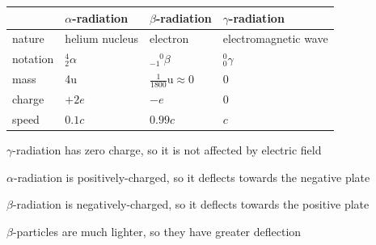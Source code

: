 \begin{center}
	{\renewcommand{\arraystretch}{1.2}
	\begin{tabular}{|C{2cm}|C{2.8cm}|C{2.8cm}|C{4.2cm}|}
	\hline  & $\alpha$-radiation & $\beta$-radiation & $\gamma$-radiation \\ 
	\hline nature & helium nucleus & electron & electromagnetic wave \\ 
	\hline notation & $^4_2\alpha$ & $^{\phantom{-}0}_{-1}\beta$ & $^0_0\gamma$ \\
	\hline mass & 4u & $\frac{1}{1800}\text{u} \approx 0$ & 0 \\[4pt]
	\hline charge & $+2e$ & $-e$ & 0 \\ 
	\hline speed & $0.1c$ & $0.99c$ & $c$ \\
	\hline
    \end{tabular}
    }
\end{center}





\begin{figure}[ht]
	\centering
\end{figure}

\begin{soln} $\gamma$-radiation has zero charge, so it is not affected by electric field

$\alpha$-radiation is positively-charged, so it deflects towards the negative plate

$\beta$-radiation is negatively-charged, so it deflects towards the positive plate

$\beta$-particles are much lighter, so they have greater deflection \end{soln}


